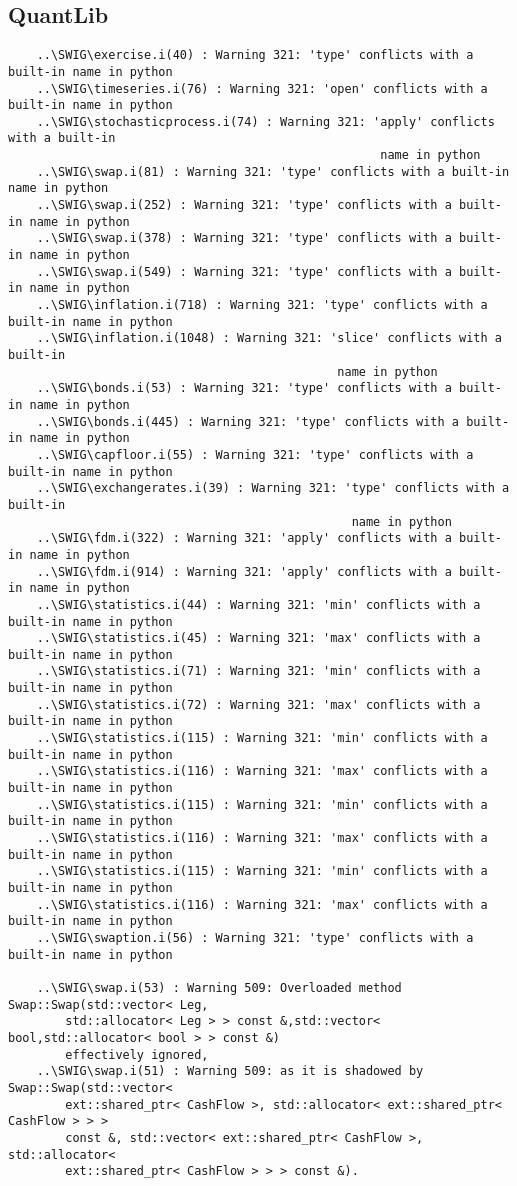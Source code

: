 \documentclass[10pt]{article}
\begin{document}
\subsection{QuantLib}
\begin{verbatim}
    ..\SWIG\exercise.i(40) : Warning 321: 'type' conflicts with a built-in name in python
    ..\SWIG\timeseries.i(76) : Warning 321: 'open' conflicts with a built-in name in python
    ..\SWIG\stochasticprocess.i(74) : Warning 321: 'apply' conflicts with a built-in
                                                    name in python
    ..\SWIG\swap.i(81) : Warning 321: 'type' conflicts with a built-in name in python
    ..\SWIG\swap.i(252) : Warning 321: 'type' conflicts with a built-in name in python
    ..\SWIG\swap.i(378) : Warning 321: 'type' conflicts with a built-in name in python
    ..\SWIG\swap.i(549) : Warning 321: 'type' conflicts with a built-in name in python
    ..\SWIG\inflation.i(718) : Warning 321: 'type' conflicts with a built-in name in python
    ..\SWIG\inflation.i(1048) : Warning 321: 'slice' conflicts with a built-in 
                                              name in python
    ..\SWIG\bonds.i(53) : Warning 321: 'type' conflicts with a built-in name in python
    ..\SWIG\bonds.i(445) : Warning 321: 'type' conflicts with a built-in name in python
    ..\SWIG\capfloor.i(55) : Warning 321: 'type' conflicts with a built-in name in python
    ..\SWIG\exchangerates.i(39) : Warning 321: 'type' conflicts with a built-in 
                                                name in python
    ..\SWIG\fdm.i(322) : Warning 321: 'apply' conflicts with a built-in name in python
    ..\SWIG\fdm.i(914) : Warning 321: 'apply' conflicts with a built-in name in python
    ..\SWIG\statistics.i(44) : Warning 321: 'min' conflicts with a built-in name in python
    ..\SWIG\statistics.i(45) : Warning 321: 'max' conflicts with a built-in name in python
    ..\SWIG\statistics.i(71) : Warning 321: 'min' conflicts with a built-in name in python
    ..\SWIG\statistics.i(72) : Warning 321: 'max' conflicts with a built-in name in python
    ..\SWIG\statistics.i(115) : Warning 321: 'min' conflicts with a built-in name in python
    ..\SWIG\statistics.i(116) : Warning 321: 'max' conflicts with a built-in name in python
    ..\SWIG\statistics.i(115) : Warning 321: 'min' conflicts with a built-in name in python
    ..\SWIG\statistics.i(116) : Warning 321: 'max' conflicts with a built-in name in python
    ..\SWIG\statistics.i(115) : Warning 321: 'min' conflicts with a built-in name in python
    ..\SWIG\statistics.i(116) : Warning 321: 'max' conflicts with a built-in name in python
    ..\SWIG\swaption.i(56) : Warning 321: 'type' conflicts with a built-in name in python

    ..\SWIG\swap.i(53) : Warning 509: Overloaded method Swap::Swap(std::vector< Leg,
        std::allocator< Leg > > const &,std::vector< bool,std::allocator< bool > > const &)
        effectively ignored,
    ..\SWIG\swap.i(51) : Warning 509: as it is shadowed by Swap::Swap(std::vector< 
        ext::shared_ptr< CashFlow >, std::allocator< ext::shared_ptr< CashFlow > > > 
        const &, std::vector< ext::shared_ptr< CashFlow >, std::allocator< 
        ext::shared_ptr< CashFlow > > > const &).
\end{verbatim}
\end{document}
